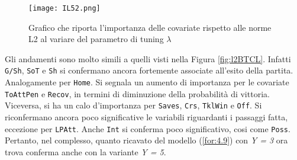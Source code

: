 \begin{figure}[]
	\begin{center}
		\texttt{[image: IL52.png]}
		\caption{Grafico che riporta l'importanza delle covariate rispetto alle norme L2 al variare del parametro di tuning $\lambda$} \label{fig:IL52}
	\end{center}
\end{figure}
Gli andamenti sono molto simili a quelli visti nella Figura \ref{fig:l2BTCL}. Infatti \texttt{G/Sh}, \texttt{SoT} e \texttt{Sh} si confermano ancora fortemente associate all'esito della partita. Analogamente per \texttt{Home}. Si segnala un aumento di importanza per le covariate \texttt{ToAttPen} e \texttt{Recov}, in termini di diminuzione della probabilità di vittoria. Viceversa, si ha un calo d'importanza per \texttt{Saves}, \texttt{Crs}, \texttt{TklWin} e \texttt{Off}. Si riconfermano ancora poco significative le variabili riguardanti i passaggi fatta, eccezione per \texttt{LPAtt}. Anche \texttt{Int} si conferma poco significativo, cosi come \texttt{Poss}.
Pertanto, nel complesso, quanto ricavato del modello (\ref{for:4.9}) con \emph{Y = 3} ora trova conferma anche con la variante \emph{Y = 5}.


